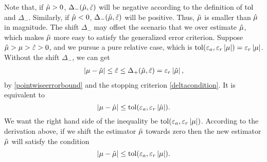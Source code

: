\documentclass{iitthesis}
\theoremstyle{definition}
\begin{document}
Note that, if $\hat{\mu} >0$, $\Delta_{-}(\hat{\mu},\hat{\varepsilon})$ will be negative according to the definition of $\operatorname{tol}$ and $\Delta_{-}$. Similarly, if $\hat{\mu} <0$, $\Delta_{-}(\hat{\mu},\hat{\varepsilon})$ will be positive. Thus, $\tilde{\mu}$ is smaller than $\hat{\mu}$ in magnitude. The shift $\Delta_-$ may offset the scenario that we over estimate $\hat{\mu}$, which makes $\tilde{\mu}$ more easy to satisfy the generalized error criterion. Suppose $\hat{\mu}>\mu>\hat{\varepsilon}>0$, and we pursue a pure relative case, which is $\operatorname{tol}(\varepsilon_a,\varepsilon_r\left \lvert \mu \right \rvert) = \varepsilon_r\left \lvert \mu \right \rvert$. Without the shift $\Delta_-$,  we can get
\begin{align}
\left \lvert \mu-\hat{\mu} \right \rvert\leq \hat{\varepsilon} \leq \Delta_{+}(\hat{\mu},\hat{\varepsilon}) = \varepsilon_r\left \lvert \hat{\mu} \right \rvert,
\end{align}
by \eqref{pointwiseerrorbound} and the stopping criterion \eqref{deltacondition}.
It is equivalent to
$$\left \lvert \mu-\hat{\mu} \right \rvert\leq \operatorname{tol}(\varepsilon_a,\varepsilon_r \left \lvert \hat{\mu} \right \rvert).$$ 
We want the right hand side of the inequality be $\operatorname{tol}(\varepsilon_a,\varepsilon_r\left \lvert \mu \right \rvert)$. According to the derivation above, if we shift the estimator $\hat{\mu}$ towards zero then the new estimator $\tilde{\mu}$ will satisfy the condition $$\left \lvert \mu-\tilde{\mu} \right \rvert \leq \operatorname{tol}(\varepsilon_a,\varepsilon_r\left \lvert \mu \right \rvert).$$
%

\label{sec:algmeanMCg}
\end{document}
